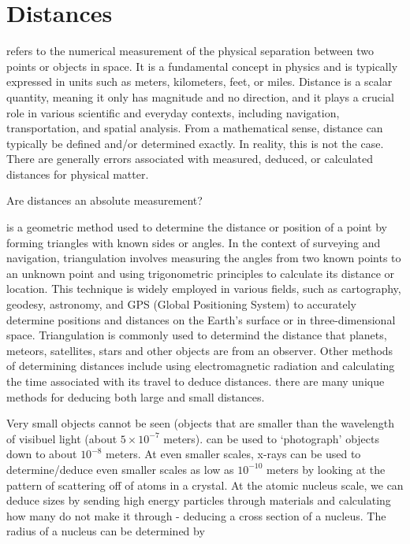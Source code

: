 \section{Distances}

 refers to the numerical measurement of the physical separation between two points or objects in space. It is a fundamental concept in physics and is typically expressed in units such as meters, kilometers, feet, or miles. Distance is a scalar quantity, meaning it only has magnitude and no direction, and it plays a crucial role in various scientific and everyday contexts, including navigation, transportation, and spatial analysis. From a mathematical sense, distance can typically be defined and/or determined exactly. In reality, this is not the case. There are generally errors associated with measured, deduced, or calculated distances for physical matter.  

\begin{questions}
	\item Are distances an absolute measurement?
\end{questions}

 is a geometric method used to determine the distance or position of a point by forming triangles with known sides or angles. In the context of surveying and navigation, triangulation involves measuring the angles from two known points to an unknown point and using trigonometric principles to calculate its distance or location. This technique is widely employed in various fields, such as cartography, geodesy, astronomy, and GPS (Global Positioning System) to accurately determine positions and distances on the Earth's surface or in three-dimensional space. Triangulation is commonly used to determind the distance that planets, meteors, satellites, stars and other objects are from an observer. Other methods of determining distances include using electromagnetic radiation and calculating the time associated with its travel to deduce distances. there are many unique methods for deducing both large and small distances.

Very small objects cannot be seen (objects that are smaller than the wavelength of visibuel light (about $5 \times 10^{-7}$ meters).  can be used to `photograph' objects down to about $10^{-8}$ meters. At even smaller scales, x-rays can be used to determine/deduce even smaller scales as low as $10^{-10}$ meters by looking at the pattern of scattering off of atoms in a crystal. At the atomic nucleus scale, we can deduce sizes by sending high energy particles through materials and calculating how many do not make it through - deducing a cross section of a nucleus. The radius of a nucleus can be determined by

